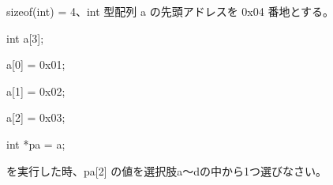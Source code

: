 sizeof(int) = 4、int 型配列 a の先頭アドレスを 0x04 番地とする。\par
\noindent int a[3]; \par
\noindent a[0] = 0x01; \par
\noindent a[1] = 0x02; \par
\noindent a[2] = 0x03; \par
\noindent int *pa = a; \par
を実行した時、pa[2] の値を選択肢a〜dの中から1つ選びなさい。
